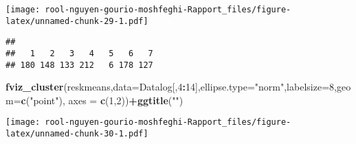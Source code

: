 \documentclass[
]{article}
\newenvironment{Shaded}{\begin{snugshade}}{\end{snugshade}}
\newcommand{\AttributeTok}[1]{\textcolor[rgb]{0.13,0.29,0.53}{#1}}
\newcommand{\DecValTok}[1]{\textcolor[rgb]{0.00,0.00,0.81}{#1}}
\newcommand{\FunctionTok}[1]{\textcolor[rgb]{0.13,0.29,0.53}{\textbf{#1}}}
\newcommand{\NormalTok}[1]{#1}
\newcommand{\OtherTok}[1]{\textcolor[rgb]{0.56,0.35,0.01}{#1}}
\newcommand{\SpecialCharTok}[1]{\textcolor[rgb]{0.81,0.36,0.00}{\textbf{#1}}}
\newcommand{\StringTok}[1]{\textcolor[rgb]{0.31,0.60,0.02}{#1}}
\begin{document}
\texttt{[image: rool-nguyen-gourio-moshfeghi-Rapport\_files/figure-latex/unnamed-chunk-29-1.pdf]}

\begin{Shaded}
\end{Shaded}

\begin{verbatim}
## 
##   1   2   3   4   5   6   7 
## 180 148 133 212   6 178 127
\end{verbatim}

\begin{Shaded}
\begin{Highlighting}[]
\FunctionTok{fviz\_cluster}\NormalTok{(reskmeans,}\AttributeTok{data=}\NormalTok{Datalog[,}\DecValTok{4}\SpecialCharTok{:}\DecValTok{14}\NormalTok{],}\AttributeTok{ellipse.type=}\StringTok{"norm"}\NormalTok{,}\AttributeTok{labelsize=}\DecValTok{8}\NormalTok{,}\AttributeTok{geom=}\FunctionTok{c}\NormalTok{(}\StringTok{"point"}\NormalTok{), }\AttributeTok{axes =} \FunctionTok{c}\NormalTok{(}\DecValTok{1}\NormalTok{,}\DecValTok{2}\NormalTok{))}\SpecialCharTok{+}\FunctionTok{ggtitle}\NormalTok{(}\StringTok{""}\NormalTok{)}
\end{Highlighting}
\end{Shaded}

\texttt{[image: rool-nguyen-gourio-moshfeghi-Rapport\_files/figure-latex/unnamed-chunk-30-1.pdf]}
\end{document}

